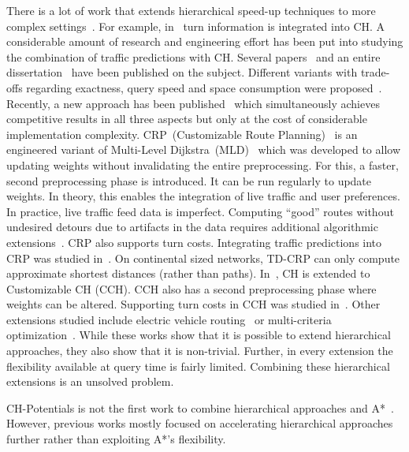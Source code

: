 \documentclass[a4paper,USenglish,cleveref, autoref, thm-restate]{lipics-v2019}
\begin{document}
There is a lot of work that extends hierarchical speed-up techniques to more complex settings~\cite{bdgmpsww-rptn-16}.
For example, in~\cite{gv-errnt-11} turn information is integrated into CH.
A considerable amount of research and engineering effort has been put into studying the combination of traffic predictions with CH.
Several papers~\cite{bdsv-tdch-09,bgns-tdcha-10,klsv-dtdch-10,bgsv-mtdtt-13} and an entire dissertation~\cite{b-tdrpc-14} have been published on the subject.
Different variants with trade-offs regarding exactness, query speed and space consumption were proposed~\cite{bgsv-mtdtt-13}.
Recently, a new approach has been published~\cite{swz-sfert-20} which simultaneously achieves competitive results in all three aspects but only at the cost of considerable implementation complexity.
%
CRP~(Customizable Route Planning)~\cite{dgpw-crprn-13} is an engineered variant of Multi-Level Dijkstra~(MLD)~\cite{swz-umlgt-02} which was developed to allow updating weights without invalidating the entire preprocessing.
For this, a faster, second preprocessing phase is introduced.
It can be run regularly to update weights.
In theory, this enables the integration of live traffic and user preferences.
In practice, live traffic feed data is imperfect.
Computing ``good'' routes without undesired detours due to artifacts in the data requires additional algorithmic extensions~\cite{dss-tarrn-18}.
CRP also supports turn costs.
Integrating traffic predictions into CRP was studied in~\cite{bdpw-dtdrp-16}.
On continental sized networks, TD-CRP can only compute approximate shortest distances (rather than paths).
%
In~\cite{dsw-cch-15}, CH is extended to Customizable CH (CCH).
CCH also has a second preprocessing phase where weights can be altered.
Supporting turn costs in CCH was studied in~\cite{bwzz-cchtc-20}.
Other extensions studied include electric vehicle routing~\cite{DBLP:journals/algorithmica/BaumDPSWZ20,DBLP:conf/aaai/EisnerFS11} or multi-criteria optimization~\cite{fns-opca-14,gks-rpfof-10}.
%
While these works show that it is possible to extend hierarchical approaches, they also show that it is non-trivial.
Further, in every extension the flexibility available at query time is fairly limited.
Combining these hierarchical extensions is an unsolved problem.

CH-Potentials is not the first work to combine hierarchical approaches and A*~\cite{bdsssw-chgds-10,gkw-blwr-07,bdgwz-sfpcs-19}.
However, previous works mostly focused on accelerating hierarchical approaches further rather than exploiting A*'s flexibility.
\end{document}
